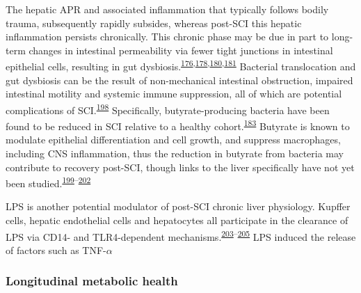 \documentclass[
]{article}
\begin{document}
The hepatic APR and associated inflammation that typically follows bodily trauma, subsequently rapidly subsides, whereas post-SCI this hepatic inflammation persists chronically.
This chronic phase may be due in part to long-term changes in intestinal permeability via fewer tight junctions in intestinal epithelial cells, resulting in gut dysbiosis.\textsuperscript{\protect\hyperlink{ref-oconnor_investigation_2018}{176},\protect\hyperlink{ref-milosevic_gut-liver_2019}{178},\protect\hyperlink{ref-kigerl_gut_2018}{180},\protect\hyperlink{ref-kigerl_gut_2016}{181}}
Bacterial translocation and gut dysbiosis can be the result of non-mechanical intestinal obstruction, impaired intestinal motility and systemic immune suppression, all of which are potential complications of SCI.\textsuperscript{\protect\hyperlink{ref-balzan_bacterial_2007}{198}}
Specifically, butyrate-producing bacteria have been found to be reduced in SCI relative to a healthy cohort.\textsuperscript{\protect\hyperlink{ref-gungor_intestinal_2016}{183}}
Butyrate is known to modulate epithelial differentiation and cell growth, and suppress macrophages, including CNS inflammation, thus the reduction in butyrate from bacteria may contribute to recovery post-SCI, though links to the liver specifically have not yet been studied.\textsuperscript{\protect\hyperlink{ref-kim_histone_2007}{199}--\protect\hyperlink{ref-chen_valproic_2007}{202}}

LPS is another potential modulator of post-SCI chronic liver physiology.
Kupffer cells, hepatic endothelial cells and hepatocytes all participate in the clearance of LPS via CD14- and TLR4-dependent mechanisms.\textsuperscript{\protect\hyperlink{ref-mimura_role_1995}{203}--\protect\hyperlink{ref-vodovotz_hepatocyte_2001}{205}}
LPS induced the release of factors such as TNF-\(\alpha\)

\hypertarget{longitudinal-metabolic-health}{%
\subsubsection{Longitudinal metabolic health}\label{longitudinal-metabolic-health}}
\end{document}
